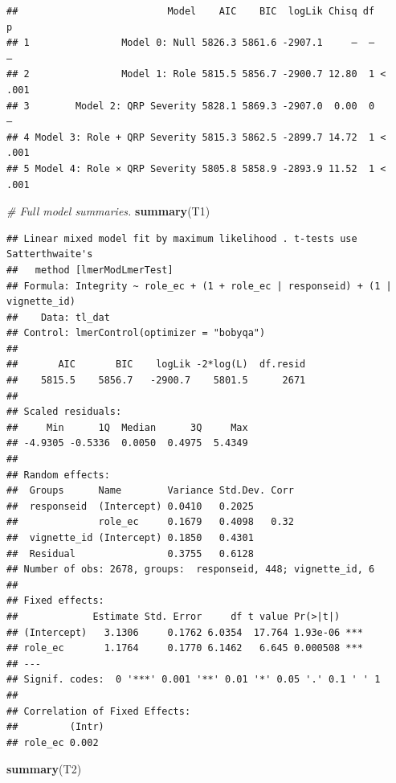 \documentclass[
]{article}
\newenvironment{Shaded}{\begin{snugshade}}{\end{snugshade}}
\newcommand{\CommentTok}[1]{\textcolor[rgb]{0.56,0.35,0.01}{\textit{#1}}}
\newcommand{\FunctionTok}[1]{\textcolor[rgb]{0.13,0.29,0.53}{\textbf{#1}}}
\newcommand{\NormalTok}[1]{#1}
\begin{document}
\begin{verbatim}
##                          Model    AIC    BIC  logLik Chisq df      p
## 1                Model 0: Null 5826.3 5861.6 -2907.1     —  —      —
## 2                Model 1: Role 5815.5 5856.7 -2900.7 12.80  1 < .001
## 3        Model 2: QRP Severity 5828.1 5869.3 -2907.0  0.00  0      —
## 4 Model 3: Role + QRP Severity 5815.3 5862.5 -2899.7 14.72  1 < .001
## 5 Model 4: Role × QRP Severity 5805.8 5858.9 -2893.9 11.52  1 < .001
\end{verbatim}

\begin{Shaded}
\begin{Highlighting}[]
\CommentTok{\# Full model summaries.}
\FunctionTok{summary}\NormalTok{(T1)}
\end{Highlighting}
\end{Shaded}

\begin{verbatim}
## Linear mixed model fit by maximum likelihood . t-tests use Satterthwaite's
##   method [lmerModLmerTest]
## Formula: Integrity ~ role_ec + (1 + role_ec | responseid) + (1 | vignette_id)
##    Data: tl_dat
## Control: lmerControl(optimizer = "bobyqa")
## 
##       AIC       BIC    logLik -2*log(L)  df.resid 
##    5815.5    5856.7   -2900.7    5801.5      2671 
## 
## Scaled residuals: 
##     Min      1Q  Median      3Q     Max 
## -4.9305 -0.5336  0.0050  0.4975  5.4349 
## 
## Random effects:
##  Groups      Name        Variance Std.Dev. Corr
##  responseid  (Intercept) 0.0410   0.2025       
##              role_ec     0.1679   0.4098   0.32
##  vignette_id (Intercept) 0.1850   0.4301       
##  Residual                0.3755   0.6128       
## Number of obs: 2678, groups:  responseid, 448; vignette_id, 6
## 
## Fixed effects:
##             Estimate Std. Error     df t value Pr(>|t|)    
## (Intercept)   3.1306     0.1762 6.0354  17.764 1.93e-06 ***
## role_ec       1.1764     0.1770 6.1462   6.645 0.000508 ***
## ---
## Signif. codes:  0 '***' 0.001 '**' 0.01 '*' 0.05 '.' 0.1 ' ' 1
## 
## Correlation of Fixed Effects:
##         (Intr)
## role_ec 0.002
\end{verbatim}

\begin{Shaded}
\begin{Highlighting}[]
\FunctionTok{summary}\NormalTok{(T2)}
\end{Highlighting}
\end{Shaded}
\end{document}
